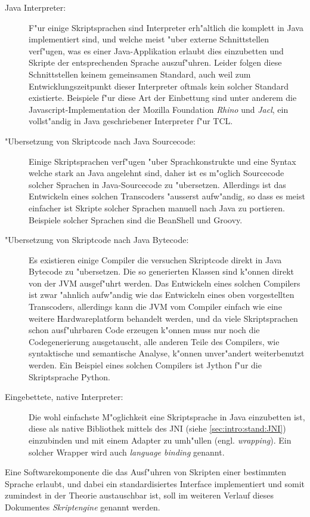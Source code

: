 \begin{description}
\item[Java Interpreter:]
F"ur einige Skriptsprachen sind Interpreter erh"altlich die komplett in Java implementiert sind, und welche
meist "uber externe Schnittstellen verf"ugen, was es einer Java-Applikation erlaubt dies einzubetten
und Skripte der entsprechenden Sprache auszuf"uhren. Leider folgen diese Schnittstellen keinem gemeinsamen
Standard, auch weil zum Entwicklungszeitpunkt dieser Interpreter oftmals kein solcher Standard existierte.
Beispiele f"ur diese Art der Einbettung sind unter anderem die Javascript-Implementation
der Mozilla Foundation \emph{Rhino} und \emph{Jacl}, ein vollst"andig in Java geschriebener Interpreter
f"ur TCL. 
\item["Ubersetzung von Skriptcode nach Java Sourcecode:]
Einige Skriptsprachen verf"ugen "uber Sprachkonstrukte und eine Syntax welche stark an Java angelehnt sind,
daher ist es m"oglich Sourcecode solcher Sprachen in Java-Sourcecode zu "ubersetzen. Allerdings ist das
Entwickeln eines solchen Transcoders "ausserst aufw"andig, so dass es meist einfacher ist Skripte solcher
Sprachen manuell nach Java zu portieren. Beispiele solcher Sprachen sind die BeanShell und Groovy.
\item["Ubersetzung von Skriptcode nach Java Bytecode:]
Es existieren einige Compiler die versuchen Skriptcode direkt in Java Bytecode zu "ubersetzen. Die so
generierten Klassen sind k"onnen direkt von der JVM ausgef"uhrt werden. Das Entwickeln eines solchen
Compilers ist zwar "ahnlich aufw"andig wie das Entwickeln eines oben vorgestellten Transcoders, allerdings
kann die JVM vom Compiler einfach wie eine weitere Hardwareplatform behandelt werden, und da viele
Skriptsprachen schon ausf"uhrbaren Code erzeugen k"onnen muss nur noch die Codegenerierung ausgetauscht,
alle anderen Teile des Compilers, wie syntaktische und semantische Analyse, k"onnen unver"andert weiterbenutzt
werden. Ein Beispiel eines solchen Compilers ist Jython f"ur die Skriptsprache Python. 
\item[Eingebettete, native Interpreter:]
Die wohl einfachste M"oglichkeit eine Skriptsprache in Java einzubetten ist, diese als native Bibliothek mittels
des JNI (siehe \ref{sec:intro:stand:JNI}) einzubinden und mit einem Adapter zu umh"ullen (engl. \emph{wrapping}). 
Ein solcher Wrapper wird auch \emph{language binding} genannt.
\end{description}
Eine Softwarekomponente die das Ausf"uhren von Skripten einer bestimmten Sprache erlaubt, und dabei ein standardisiertes
Interface implementiert und somit zumindest in der Theorie austauschbar ist, soll im weiteren Verlauf
dieses Dokumentes \emph{Skriptengine} genannt werden.

